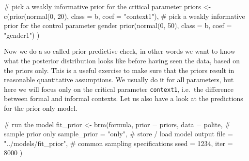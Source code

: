 \documentclass[
  doc,
  floatsintext,
  longtable,
  nolmodern,
  notxfonts,
  notimes,
  colorlinks=true,linkcolor=blue,citecolor=blue,urlcolor=blue]{apa7}
\newenvironment{Shaded}{\begin{snugshade}}{\end{snugshade}}
\newcommand{\AttributeTok}[1]{\textcolor[rgb]{0.40,0.45,0.13}{#1}}
\newcommand{\CommentTok}[1]{\textcolor[rgb]{0.37,0.37,0.37}{#1}}
\newcommand{\DecValTok}[1]{\textcolor[rgb]{0.68,0.00,0.00}{#1}}
\newcommand{\FunctionTok}[1]{\textcolor[rgb]{0.28,0.35,0.67}{#1}}
\newcommand{\NormalTok}[1]{\textcolor[rgb]{0.00,0.23,0.31}{#1}}
\newcommand{\OtherTok}[1]{\textcolor[rgb]{0.00,0.23,0.31}{#1}}
\newcommand{\StringTok}[1]{\textcolor[rgb]{0.13,0.47,0.30}{#1}}
\begin{document}
\begin{Shaded}
\begin{Highlighting}[]
\CommentTok{\# pick a weakly informative prior for the critical parameter}
\NormalTok{priors }\OtherTok{\textless{}{-}} \FunctionTok{c}\NormalTok{(}\FunctionTok{prior}\NormalTok{(}\FunctionTok{normal}\NormalTok{(}\DecValTok{0}\NormalTok{, }\DecValTok{20}\NormalTok{), }
                  \AttributeTok{class =}\NormalTok{ b, }
                  \AttributeTok{coef =} \StringTok{"context1"}\NormalTok{),}
            \CommentTok{\# pick a weakly informative prior for the control parameter gender}
            \FunctionTok{prior}\NormalTok{(}\FunctionTok{normal}\NormalTok{(}\DecValTok{0}\NormalTok{, }\DecValTok{50}\NormalTok{), }
                  \AttributeTok{class =}\NormalTok{ b, }
                  \AttributeTok{coef =} \StringTok{"gender1"}\NormalTok{)}
\NormalTok{            )}
\end{Highlighting}
\end{Shaded}

Now we do a so-called prior predictive check, in other words we want to
know what the posterior distribution looks like before having seen the
data, based on the priors only. This is a useful exercise to make sure
that the priors result in reasonable quantitative assumptions. We
usually do it for all parameters, but here we will focus only on the
critical parameter \texttt{context1}, i.e.~the difference between formal
and informal contexts. Let us also have a look at the predictions for
the prior-only model.

\begin{Shaded}
\begin{Highlighting}[]
\CommentTok{\# run the model}
\NormalTok{fit\_prior }\OtherTok{\textless{}{-}} \FunctionTok{brm}\NormalTok{(formula, }\AttributeTok{prior =}\NormalTok{ priors, }\AttributeTok{data =}\NormalTok{ polite,}
           \CommentTok{\# sample prior only}
           \AttributeTok{sample\_prior =} \StringTok{"only"}\NormalTok{,}
           \CommentTok{\# store / load model output}
           \AttributeTok{file  =} \StringTok{"../models/fit\_prior"}\NormalTok{,}
           \CommentTok{\# common sampling specifications}
           \AttributeTok{seed =} \DecValTok{1234}\NormalTok{, }\AttributeTok{iter =} \DecValTok{8000}
\NormalTok{           )}
\end{Highlighting}
\end{Shaded}
\end{document}
